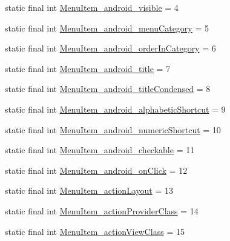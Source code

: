 \begin{DoxyCompactItemize}
\item 
static final int \mbox{\hyperlink{classcom_1_1synnapps_1_1carouselview_1_1_r_1_1styleable_ad6221ee883ad989f654b35f141c06f4b}{Menu\+Item\+\_\+android\+\_\+visible}} = 4
\item 
static final int \mbox{\hyperlink{classcom_1_1synnapps_1_1carouselview_1_1_r_1_1styleable_a082a773d1f5f4aa7febb7a268a76acd4}{Menu\+Item\+\_\+android\+\_\+menu\+Category}} = 5
\item 
static final int \mbox{\hyperlink{classcom_1_1synnapps_1_1carouselview_1_1_r_1_1styleable_a9101324719b8942640ed3f7688bc5ca3}{Menu\+Item\+\_\+android\+\_\+order\+In\+Category}} = 6
\item 
static final int \mbox{\hyperlink{classcom_1_1synnapps_1_1carouselview_1_1_r_1_1styleable_add6157a3408bf4434ade41fb72da6acf}{Menu\+Item\+\_\+android\+\_\+title}} = 7
\item 
static final int \mbox{\hyperlink{classcom_1_1synnapps_1_1carouselview_1_1_r_1_1styleable_acb5460f2e248124b57447dead068e565}{Menu\+Item\+\_\+android\+\_\+title\+Condensed}} = 8
\item 
static final int \mbox{\hyperlink{classcom_1_1synnapps_1_1carouselview_1_1_r_1_1styleable_abdf42b2441fb39459715756a0f97629e}{Menu\+Item\+\_\+android\+\_\+alphabetic\+Shortcut}} = 9
\item 
static final int \mbox{\hyperlink{classcom_1_1synnapps_1_1carouselview_1_1_r_1_1styleable_aa4a3e21c0884932e211a73cd37d900ae}{Menu\+Item\+\_\+android\+\_\+numeric\+Shortcut}} = 10
\item 
static final int \mbox{\hyperlink{classcom_1_1synnapps_1_1carouselview_1_1_r_1_1styleable_a4b978dd9a2ce5303b8ce440378d17e4f}{Menu\+Item\+\_\+android\+\_\+checkable}} = 11
\item 
static final int \mbox{\hyperlink{classcom_1_1synnapps_1_1carouselview_1_1_r_1_1styleable_a96d1136f53a90d680a069e545ef76392}{Menu\+Item\+\_\+android\+\_\+on\+Click}} = 12
\item 
static final int \mbox{\hyperlink{classcom_1_1synnapps_1_1carouselview_1_1_r_1_1styleable_a458d221799730fd71be7d9093360724a}{Menu\+Item\+\_\+action\+Layout}} = 13
\item 
static final int \mbox{\hyperlink{classcom_1_1synnapps_1_1carouselview_1_1_r_1_1styleable_a58b787a184650bf5e9315a5296431bad}{Menu\+Item\+\_\+action\+Provider\+Class}} = 14
\item 
static final int \mbox{\hyperlink{classcom_1_1synnapps_1_1carouselview_1_1_r_1_1styleable_a9cc28dbebd301d46f305e6e47ac3b885}{Menu\+Item\+\_\+action\+View\+Class}} = 15

\end{DoxyCompactItemize}
